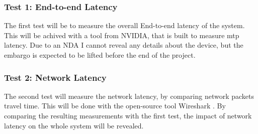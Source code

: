 \subsubsection{Test 1: End-to-end Latency}
The first test will be to measure the overall End-to-end latency of the system. This will be achived with a tool from NVIDIA, that is built to measure \acrshort{mtp} latency. Due to an NDA I cannot reveal any details about the device, but the embargo is expected to be lifted before the end of the project.

\subsubsection{Test 2: Network Latency}
The second test will measure the network latency, by comparing network packets travel time. This will be done with the open-source tool Wireshark \parencite{wireshark}. By comparing the resulting measurements with the first test, the impact of network latency on the whole system will be revealed.